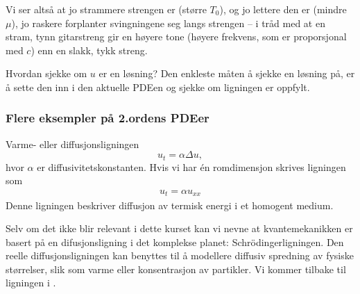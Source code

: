 Vi ser altså at jo strammere strengen er (større $T_0$), og jo lettere den er (mindre $\mu$), jo raskere forplanter svingningene seg langs strengen -- i tråd med at en stram, tynn gitarstreng gir en høyere tone (høyere frekvens, som er proporsjonal med $c$) enn en slakk, tykk streng.

\begin{oppsum}{Hvordan sjekke om $u$ er en løsning?}
Den enkleste måten å sjekke en løsning på, er å sette den inn i den aktuelle PDEen og sjekke om ligningen er oppfylt.
\end{oppsum}

\subsubsection{Flere eksempler på 2.ordens PDEer}

\begin{eks}{Varme- eller diffusjonsligningen}
\[
u_t =\alpha \Delta u,
\]
hvor \( \alpha \) er diffusivitetskonstanten. Hvis vi har én romdimensjon skrives ligningen som
\begin{align}\label{eq:diffeq}
u_t = \alpha u_{xx}\end{align}
Denne ligningen beskriver diffusjon av termisk energi i et homogent medium. 
\end{eks}
Selv om det ikke blir relevant i dette kurset kan vi nevne at kvantemekanikken er basert på en difusjonsligning i det komplekse planet: Schrödingerligningen.
Den reelle diffusjonsligningen kan benyttes til å modellere diffusiv spredning av fysiske størrelser, slik som varme eller konsentrasjon av partikler. Vi kommer tilbake til ligningen i .

